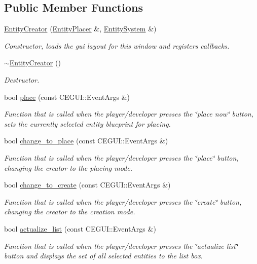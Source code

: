 \subsection*{Public Member Functions}
\begin{DoxyCompactItemize}
\item 
\hyperlink{class_entity_creator_a980c1beb6678a23e40f34a821099ca73}{Entity\+Creator} (\hyperlink{class_entity_placer}{Entity\+Placer} \&, \hyperlink{class_entity_system}{Entity\+System} \&)
\begin{DoxyCompactList}\small\item\em Constructor, loads the gui layout for this window and registers callbacks. \end{DoxyCompactList}\item 
\hyperlink{class_entity_creator_a070bdc284ddbd15dc8359b4bdf960e9c}{$\sim$\+Entity\+Creator} ()
\begin{DoxyCompactList}\small\item\em Destructor. \end{DoxyCompactList}\item 
bool \hyperlink{class_entity_creator_a7ed9e893dbbee279a85a7b4479fc5e8c}{place} (const C\+E\+G\+U\+I\+::\+Event\+Args \&)
\begin{DoxyCompactList}\small\item\em Function that is called when the player/developer presses the \char`\"{}place now\char`\"{} button, sets the currently selected entity blueprint for placing. \end{DoxyCompactList}\item 
bool \hyperlink{class_entity_creator_a7b114e5282d17e6a2ec7dc7219a14fe2}{change\+\_\+to\+\_\+place} (const C\+E\+G\+U\+I\+::\+Event\+Args \&)
\begin{DoxyCompactList}\small\item\em Function that is called when the player/developer presses the \char`\"{}place\char`\"{} button, changing the creator to the placing mode. \end{DoxyCompactList}\item 
bool \hyperlink{class_entity_creator_ae055603836c5c525dcdf7a9a850fb600}{change\+\_\+to\+\_\+create} (const C\+E\+G\+U\+I\+::\+Event\+Args \&)
\begin{DoxyCompactList}\small\item\em Function that is called when the player/developer presses the \char`\"{}create\char`\"{} button, changing the creator to the creation mode. \end{DoxyCompactList}\item 
bool \hyperlink{class_entity_creator_a3f0182b955bc10f344c5df5c293bb618}{actualize\+\_\+list} (const C\+E\+G\+U\+I\+::\+Event\+Args \&)
\begin{DoxyCompactList}\small\item\em Function that is called when the player/developer presses the \char`\"{}actualize
       list\char`\"{} button and displays the set of all selected entities to the list box. \end{DoxyCompactList}\end{DoxyCompactItemize}
